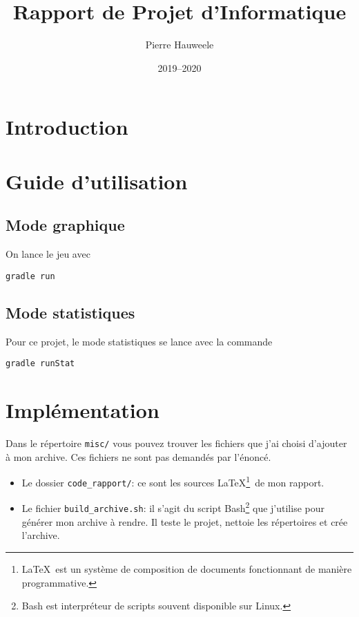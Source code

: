 \documentclass[a4paper]{article}
\author{Pierre Hauweele}
\title{Rapport de Projet d'Informatique}
\date{2019--2020}
\begin{document}
\maketitle

\section{Introduction}
\lipsum[1-1]

\section{Guide d'utilisation}
\subsection{Mode graphique}
On lance le jeu avec
\begin{verbatim}
gradle run
\end{verbatim}
\subsection{Mode statistiques}
Pour ce projet, le mode statistiques se lance avec la commande
\begin{verbatim}
gradle runStat
\end{verbatim}

\section{Implémentation}
Dans le répertoire \texttt{misc/} vous pouvez trouver les fichiers que
j'ai choisi d'ajouter à mon archive. Ces fichiers ne sont pas demandés
par l'énoncé.
\begin{itemize}
  \item Le dossier \texttt{code\_rapport/}: ce sont les sources
    \LaTeX\footnote{\LaTeX\ est un système de composition de documents
    fonctionnant de manière programmative.}\ de mon rapport.
  \item Le fichier \texttt{build\_archive.sh}: il s'agit du script
    Bash\footnote{Bash est interpréteur de scripts souvent disponible sur
    Linux.} que j'utilise pour générer mon archive à rendre. Il teste le
    projet, nettoie les répertoires et crée l'archive.
\end{itemize}
\end{document}
